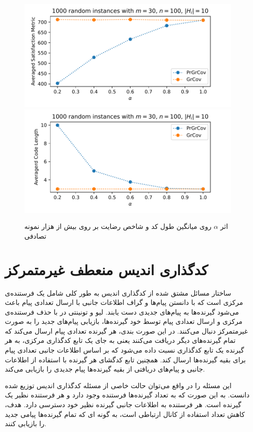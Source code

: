 \begin{figure}[H]
	\centering
	{\includegraphics[width=0.4\linewidth]{figs/chapter4/cost_alpha_grcov_prgrcov.pdf}\vspace{-2ex}}
	{\includegraphics[width=0.4				\linewidth]{figs/chapter4/code_length_alpha_grcov_prgrcov.pdf}\vspace{-2ex}}
	\caption{
		اثر
		$\alpha$
		روی میانگین طول کد و شاخص رضایت بر روی بیش از هزار نمونه تصادفی
}
	\label{fig:alpha}
\end{figure}

\section{کدگذاری اندیس منعطف غیرمتمرکز}
ساختار مسائل مشتق شده از کدگذاری اندیس به طور کلی شامل یک فرستنده‌ی مرکزی است که با دانستن پیام‌ها و گراف اطلاعات جانبی با ارسال تعدادی پیام باعث می‌شود گیرنده‌ها به پیام‌های جدیدی دست یابند. لیو و تونینتی در
\cite{paper:Decentralized}
با حذف فرستنده‌ی مرکزی و ارسال تعدادی پیام توسط خود گیرنده‌ها، بازیابی پیام‌های جدید را به صورت غیرمتمرکز دنبال می‌کنند. در این صورت بندی، هر گیرنده تعدادی پیام ارسال می‌کند که تمام گیرنده‌های دیگر دریافت می‌کنند یعنی به جای یک تابع کدگذاری مرکزی، به هر گیرنده یک تابع کدگذاری نسبت داده می‌شود که بر اساس اطلاعات جانبی تعدادی پیام برای بقیه گیرنده‌ها ارسال کند. همچنین تابع کدگشای هر گیرنده با استفاده از اطلاعات جانبی و پیام‌های دریافتی از بقیه گیرنده‌ها پیام جدیدی را بازیابی می‌کند.

این مسئله را در واقع می‌توان حالت خاصی از مسئله کدگذاری اندیس توزیع شده
\cite{9022912}
دانست. به این صورت که به تعداد گیرنده‌ها فرستنده وجود دارد و هر فرستنده نظیر یک گیرنده است. هر فرستنده به اطلاعات جانبی گیرنده نظیر خود دسترسی دارد. هدف، کاهش تعداد استفاده از کانال ارتباطی است، به گونه ای که تمام گیرنده‌ها پیامی جدید را بازیابی کنند.

